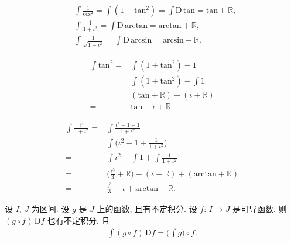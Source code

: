 \begin{example}
    \begin{align*}
         & \int {\frac{1}{\mathrm{cos}^2}} = \int {(1 + \mathrm{tan}^2)} = \int {\mathrm{D}\,\mathrm{tan}} = \mathrm{tan} + \mathbb{R}, \\
         & \int {\frac{1}{1 + \iota^2}} = \int {\mathrm{D}\,\mathrm{arctan}} = \mathrm{arctan} + \mathbb{R},                            \\
         & \int {\frac{1}{\sqrt{1 - \iota^2}}} = \int {\mathrm{D}\,\mathrm{arcsin}} = \mathrm{arcsin} + \mathbb{R}.
    \end{align*}
\end{example}

\begin{example}
    \begin{align*}
        \int {\mathrm{tan}^2}
        = {} & \int {(1 + \mathrm{tan}^2) - 1}                    \\
        = {} & \int {(1 + \mathrm{tan}^2)} - \int {1}             \\
        = {} & (\mathrm{tan} + \mathbb{R}) - (\iota + \mathbb{R}) \\
        = {} & \mathrm{tan} - \iota + \mathbb{R}.
    \end{align*}
\end{example}

\begin{example}
    \begin{align*}
        \int {\frac{\iota^4}{1 + \iota^2}}
        = {} & \int {\frac{\iota^4 - 1 + 1}{1 + \iota^2}}                                                           \\
        = {} & \int {\Bigg( \iota^2 - 1 + \frac{1}{1 + \iota^2} \Bigg)}                                             \\
        = {} & \int {\iota^2} - \int {1} + \int {\frac{1}{1 + \iota^2}}                                             \\
        = {} & \Bigg( \frac{\iota^3}{3} + \mathbb{R} \Bigg) - (\iota + \mathbb{R}) + (\mathrm{arctan} + \mathbb{R}) \\
        = {} & \frac{\iota^3}{3} - \iota + \mathrm{arctan} + \mathbb{R}.
    \end{align*}
\end{example}

\begin{theorem}
    设 $I$, $J$ 为区间.
    设 $g$ 是 $J$ 上的函数, 且有不定积分.
    设 $f$: $I \to J$ 是可导函数.
    则 $(g \circ f)\, \mathrm{D}f$ 也有不定积分, 且
    \begin{align*}
        \int {(g \circ f)\, \mathrm{D}f} = \Bigg( \int {g} \Bigg) \circ f.
    \end{align*}
\end{theorem}

